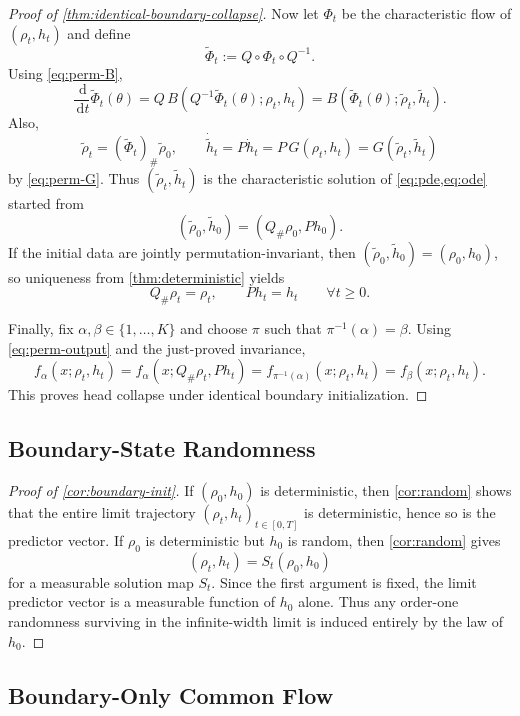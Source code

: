 \documentclass[11pt]{article}
\theoremstyle{definition}
\newcommand{\dd}{\,\mathrm{d}}
\begin{document}
\begin{proof}[Proof of \cref{thm:identical-boundary-collapse}]
Now let $\Phi_t$ be the characteristic flow of $(\rho_t,h_t)$ and define
\[
  \widetilde\Phi_t:=Q\circ \Phi_t\circ Q^{-1}.
\]
Using \eqref{eq:perm-B},
\[
  \frac{\dd}{\dd t}\widetilde\Phi_t(\theta)
  =
  Q\,B(Q^{-1}\widetilde\Phi_t(\theta);\rho_t,h_t)
  =
  B(\widetilde\Phi_t(\theta);\widetilde\rho_t,\widetilde h_t).
\]
Also,
\[
  \widetilde\rho_t=(\widetilde\Phi_t)_\#\widetilde\rho_0,
  \qquad
  \dot{\widetilde h}_t
  =
  P\dot h_t
  =
  P\,G(\rho_t,h_t)
  =
  G(\widetilde\rho_t,\widetilde h_t)
\]
by \eqref{eq:perm-G}. Thus $(\widetilde\rho_t,\widetilde h_t)$ is the
characteristic solution of \cref{eq:pde,eq:ode} started from
\[
  (\widetilde\rho_0,\widetilde h_0)
  =
  (Q_\#\rho_0,P h_0).
\]
If the initial data are jointly permutation-invariant, then
$(\widetilde\rho_0,\widetilde h_0)=(\rho_0,h_0)$, so uniqueness from
\cref{thm:deterministic} yields
\[
  Q_\#\rho_t=\rho_t,
  \qquad
  P h_t=h_t
  \qquad
  \forall t\ge 0.
\]

Finally, fix $\alpha,\beta\in\{1,\dots,K\}$ and choose $\pi$ such that
$\pi^{-1}(\alpha)=\beta$. Using \eqref{eq:perm-output} and the just-proved
invariance,
\[
  f_\alpha(x;\rho_t,h_t)
  =
  f_\alpha(x;Q_\#\rho_t,P h_t)
  =
  f_{\pi^{-1}(\alpha)}(x;\rho_t,h_t)
  =
  f_\beta(x;\rho_t,h_t).
\]
This proves head collapse under identical boundary initialization.
\end{proof}

\subsection{Boundary-State Randomness}

\begin{proof}[Proof of \cref{cor:boundary-init}]
If $(\rho_0,h_0)$ is deterministic, then \cref{cor:random} shows that the
entire limit trajectory $(\rho_t,h_t)_{t\in[0,T]}$ is deterministic, hence so is
the predictor vector. If $\rho_0$ is deterministic but $h_0$ is random, then
\cref{cor:random} gives
\[
  (\rho_t,h_t)=S_t(\rho_0,h_0)
\]
for a measurable solution map $S_t$. Since the first argument is fixed, the
limit predictor vector is a measurable function of $h_0$ alone. Thus any
order-one randomness surviving in the infinite-width limit is induced entirely
by the law of $h_0$.
\end{proof}

\subsection{Boundary-Only Common Flow}
\end{document}
